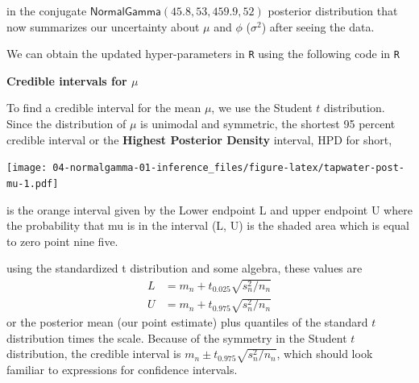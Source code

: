\documentclass[]{book}
\newenvironment{Shaded}{\begin{snugshade}}{\end{snugshade}}
\newcommand{\KeywordTok}[1]{\textcolor[rgb]{0.13,0.29,0.53}{\textbf{{#1}}}}
\newcommand{\DecValTok}[1]{\textcolor[rgb]{0.00,0.00,0.81}{{#1}}}
\newcommand{\FloatTok}[1]{\textcolor[rgb]{0.00,0.00,0.81}{{#1}}}
\newcommand{\StringTok}[1]{\textcolor[rgb]{0.31,0.60,0.02}{{#1}}}
\newcommand{\CommentTok}[1]{\textcolor[rgb]{0.56,0.35,0.01}{\textit{{#1}}}}
\newcommand{\NormalTok}[1]{{#1}}
\theoremstyle{definition}
\theoremstyle{definition}
\theoremstyle{definition}
\theoremstyle{remark}
\begin{document}
in the conjugate \(\textsf{NormalGamma}(45.8, 53, 459.9, 52)\) posterior
distribution that now summarizes our uncertainty about \(\mu\) and
\(\phi\) (\(\sigma^2\)) after seeing the data.

We can obtain the updated hyper-parameters in \texttt{R} using the
following code in \texttt{R}

\begin{Shaded}
\end{Shaded}

\textbf{Credible intervals for \(\mu\)}

To find a credible interval for the mean \(\mu\), we use the Student
\(t\) distribution. Since the distribution of \(\mu\) is unimodal and
symmetric, the shortest 95 percent credible interval or the
\textbf{Highest Posterior Density} interval, HPD for short,

\texttt{[image: 04-normalgamma-01-inference\_files/figure-latex/tapwater-post-mu-1.pdf]}

is the orange interval given by the Lower endpoint L and upper endpoint
U where the probability that mu is in the interval (L, U) is the shaded
area which is equal to zero point nine five.

using the standardized t distribution and some algebra, these values are
\[
\begin{aligned}
  L & =  m_n + t_{0.025}\sqrt{s^2_n/n_n}    \\
  U & =  m_n + t_{0.975}\sqrt{s^2_n/n_n}
\end{aligned}
\] or the posterior mean (our point estimate) plus quantiles of the
standard \(t\) distribution times the scale. Because of the symmetry in
the Student \(t\) distribution, the credible interval is
\(m_n \pm t_{0.975}\sqrt{s^2_n/n_n}\), which should look familiar to
expressions for confidence intervals.
\end{document}
